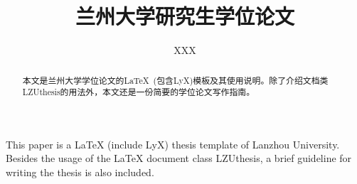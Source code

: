 \documentclass[twoside,longtitle]{LZUthesis}
\begin{document}
	



\title{兰州大学研究生学位论文}




\author{XXX}





\collaborator{}






\maketitle

\makestatement

\frontmatter{}

\begin{abstract}
本文是兰州大学学位论文的\LaTeX{} (包含LyX)模板及其使用说明。除了介绍文档类LZUthesis的用法外，本文还是一份简要的学位论文写作指南。
\end{abstract}


\begin{englishabstract}
This paper is a \LaTeX{} (include LyX) thesis template of Lanzhou University. Besides the usage of the LaTeX document class LZUthesis, a brief guideline for writing the thesis is also included.
\end{englishabstract}
\end{document}
